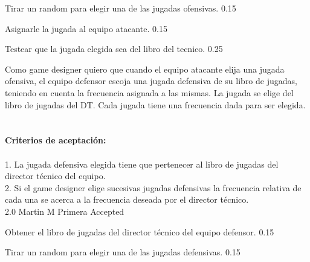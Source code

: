 		{Tirar un random para elegir una de las jugadas ofensivas.} %
		{} %
		{0.15} %
		{} %
		{} %
		{} %
		
		{Asignarle la jugada al equipo atacante.} %
		{} %
		{0.15} %
		{} %
		{} %
		{} %

		{Testear que la jugada elegida sea del libro del tecnico.} %
		{} %
		{0.25} %
		{} %
		{} %
		{} %
\vspace{20pt}


	{Como game designer quiero que cuando el equipo atacante elija una jugada ofensiva, el equipo defensor escoja una jugada defensiva de su libro de jugadas, teniendo en cuenta la frecuencia asignada a las mismas.} %
	{La jugada se elige del libro de jugadas del DT. Cada jugada tiene una frecuencia dada para ser elegida.
 \\
  \\
  \\
\textbf{Criterios de aceptación:}\\
  \\
1. La jugada defensiva elegida tiene que pertenecer al libro de jugadas del director técnico del equipo.  \\
2. Si el game designer elige sucesivas jugadas defensivas la frecuencia relativa de cada una se acerca a la frecuencia deseada por el director técnico. \\
} %
	{} %
	{2.0} %
	{Martin M} %
	{Primera} %
	{Accepted} %

		{Obtener el libro de jugadas del director técnico del equipo defensor.} %
		{} %
		{0.15} %
		{} %
		{} %
		{} %

		{Tirar un random para elegir una de las jugadas defensivas.} %
		{} %
		{0.15} %
		{} %
		{} %
		{} %
		
